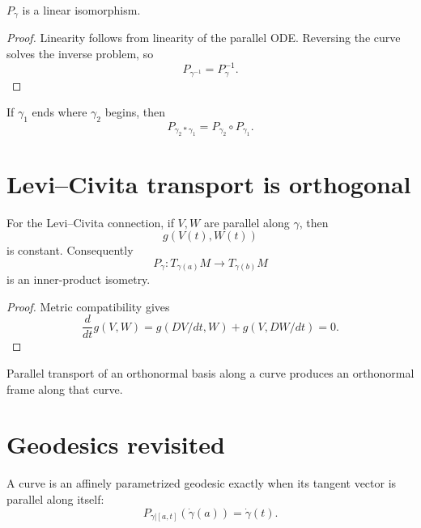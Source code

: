 \begin{proposition}\label{prop:vii24-linear}
\(P_\gamma\) is a linear isomorphism.
\end{proposition}

\begin{proof}
Linearity follows from linearity of the parallel ODE.  Reversing the curve solves
the inverse problem, so
\[
P_{\gamma^{-1}}=P_\gamma^{-1}.
\]
\end{proof}

\begin{proposition}[Concatenation]\label{prop:vii24-concat}
If \(\gamma_1\) ends where \(\gamma_2\) begins, then
\[
P_{\gamma_2*\gamma_1}
=
P_{\gamma_2}\circ P_{\gamma_1}.
\]
\end{proposition}

\section{Levi--Civita transport is orthogonal}

\begin{theorem}\label{thm:vii24-metric}
For the Levi--Civita connection, if \(V,W\) are parallel along \(\gamma\), then
\[
g(V(t),W(t))
\]
is constant. Consequently
\[
P_\gamma:T_{\gamma(a)}M\to T_{\gamma(b)}M
\]
is an inner-product isometry.
\end{theorem}

\begin{proof}
Metric compatibility gives
\[
\frac d{dt}g(V,W)
=
g(DV/dt,W)+g(V,DW/dt)=0.
\]
\end{proof}

\begin{corollary}\label{cor:vii24-frames}
Parallel transport of an orthonormal basis along a curve produces an orthonormal
frame along that curve.
\end{corollary}

\section{Geodesics revisited}

\begin{proposition}\label{prop:vii24-geodesic}
A curve is an affinely parametrized geodesic exactly when its tangent vector is
parallel along itself:
\[
P_{\gamma|[a,t]}(\dot\gamma(a))=\dot\gamma(t).
\]
\end{proposition}

